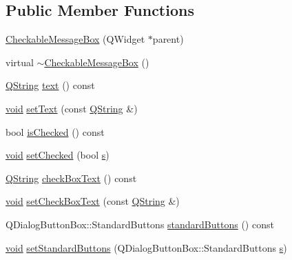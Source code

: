 \subsection*{Public Member Functions}
\begin{DoxyCompactItemize}
\item 
\hyperlink{class_utils_1_1_checkable_message_box_a8aeacdf27f60a7d5df576830a2961f9d}{Checkable\-Message\-Box} (Q\-Widget $\ast$parent)
\item 
virtual \hyperlink{class_utils_1_1_checkable_message_box_a941dd115116674416d90e8c199945162}{$\sim$\-Checkable\-Message\-Box} ()
\item 
\hyperlink{group___u_a_v_objects_plugin_gab9d252f49c333c94a72f97ce3105a32d}{Q\-String} \hyperlink{class_utils_1_1_checkable_message_box_ab5f8fab0128931194df6cbfae5ec239f}{text} () const 
\item 
\hyperlink{group___u_a_v_objects_plugin_ga444cf2ff3f0ecbe028adce838d373f5c}{void} \hyperlink{class_utils_1_1_checkable_message_box_a7d5fad3765d806b6f123092a981fd3d8}{set\-Text} (const \hyperlink{group___u_a_v_objects_plugin_gab9d252f49c333c94a72f97ce3105a32d}{Q\-String} \&)
\item 
bool \hyperlink{class_utils_1_1_checkable_message_box_ad9d64b80175be2daccaca8f6dbeb258d}{is\-Checked} () const 
\item 
\hyperlink{group___u_a_v_objects_plugin_ga444cf2ff3f0ecbe028adce838d373f5c}{void} \hyperlink{class_utils_1_1_checkable_message_box_a7e33fe6bbc0aada5a8cd676d3c45cb27}{set\-Checked} (bool \hyperlink{glext_8h_ad585a1393cfa368fa9dc3d8ebff640d5}{s})
\item 
\hyperlink{group___u_a_v_objects_plugin_gab9d252f49c333c94a72f97ce3105a32d}{Q\-String} \hyperlink{class_utils_1_1_checkable_message_box_ae0cc594421977656bfc114a3a3d1b491}{check\-Box\-Text} () const 
\item 
\hyperlink{group___u_a_v_objects_plugin_ga444cf2ff3f0ecbe028adce838d373f5c}{void} \hyperlink{class_utils_1_1_checkable_message_box_a61df735b4b31dbafba41a08706d3acb9}{set\-Check\-Box\-Text} (const \hyperlink{group___u_a_v_objects_plugin_gab9d252f49c333c94a72f97ce3105a32d}{Q\-String} \&)
\item 
Q\-Dialog\-Button\-Box\-::\-Standard\-Buttons \hyperlink{class_utils_1_1_checkable_message_box_a73d689c7d4852c19217ce3107ce1f66f}{standard\-Buttons} () const 
\item 
\hyperlink{group___u_a_v_objects_plugin_ga444cf2ff3f0ecbe028adce838d373f5c}{void} \hyperlink{class_utils_1_1_checkable_message_box_a3b0d5dff93907b3a77900b0754be2fbf}{set\-Standard\-Buttons} (Q\-Dialog\-Button\-Box\-::\-Standard\-Buttons \hyperlink{glext_8h_ad585a1393cfa368fa9dc3d8ebff640d5}{s})

\end{DoxyCompactItemize}
